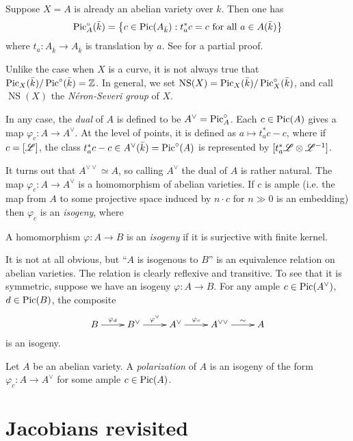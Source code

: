 \documentclass{article}
\begin{document}
Suppose $X=A$ is already an abelian variety over $k$. Then one has 
\[
  \operatorname{Pic}_A^\circ(\bar k) = \left\{c\in \operatorname{Pic}(A_{\bar k}) : t_a^* c = c\text{ for all }a\in A(\bar k)\right\} 
\]
where $t_a:A_{\bar k}\to A_{\bar k}$ is translation by $a$. See 
\cite[I.8.4]{mi} for a partial proof. 

Unlike the case when $X$ is a curve, it is not always true that 
$\operatorname{Pic}_X(\bar k)/\operatorname{Pic}^\circ(\bar k) = \mathbb{Z}$. In general, we set 
$\operatorname{NS}(X) = \operatorname{Pic}_X(\bar k) / \operatorname{Pic}_X^\circ(\bar k)$, and call 
$\operatorname{NS}(X)$ the \emph{N\'eron-Severi group} of $X$. 

In any case, the \emph{dual} of $A$ is defined to be $A^\vee = \operatorname{Pic}_A^\circ$. 
Each $c\in \operatorname{Pic}(A)$ gives a map $\varphi_c:A\to A^\vee$. At the level of 
points, it is defined as $a\mapsto t_a^* c - c$, where if $c=[\mathscr{L}]$, 
the class $t_a^*c - c\in A^\vee(\bar k) = \operatorname{Pic}^\circ(A)$ is represented by 
$[t_a^*\mathscr{L}\otimes\mathscr{L}^{-1}]$. 

It turns out that $A^{\vee\vee} \simeq A$, so calling $A^\vee$ the dual of $A$ 
is rather natural. The map $\varphi_c:A\to A^\vee$ is a homomorphism of abelian 
varieties. If $c$ is ample (i.e. the map from $A$ to some projective space 
induced by $n\cdot c$ for $n\gg 0$ is an embedding) then $\varphi_c$ is an 
\emph{isogeny}, where 

\begin{definition}
A homomorphism $\varphi:A\to B$ is an \emph{isogeny} if it is surjective with 
finite kernel.
\end{definition}

It is not at all obvious, but ``$A$ is isogenous to $B$'' is an equivalence 
relation on abelian varieties. The relation is clearly reflexive and 
transitive. To see that it is symmetric, suppose we have an 
isogeny $\varphi:A\to B$. For any ample $c\in \operatorname{Pic}(A^\vee)$, $d\in \operatorname{Pic}(B)$, 
the composite 
\[\xymatrix{
  B \ar[r]^-{\varphi_d} 
    & B^\vee \ar[r]^-{\varphi^\vee} 
    & A^\vee \ar[r]^-{\varphi_c}
    & A^{\vee\vee} \ar[r]^-\sim 
    & A
}\]
is an isogeny. 

\begin{definition}
Let $A$ be an abelian variety. A \emph{polarization} of $A$ is an isogeny 
of the form $\varphi_c:A\to A^\vee$ for some ample $c\in \operatorname{Pic}(A)$.
\end{definition}





\section{Jacobians revisited}
\end{document}
